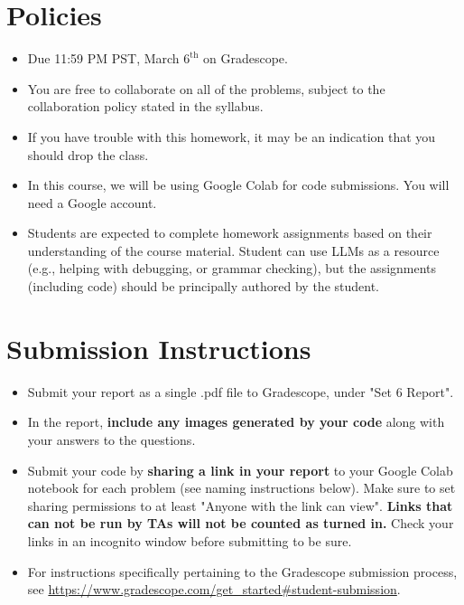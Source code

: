 \documentclass{article}
\begin{document}
\pagestyle{fancy}


\section*{Policies}
\begin{itemize}
	\item Due 11:59 PM PST, March $6^\text{th}$ on Gradescope. 
	\item You are free to collaborate on all of the problems, subject to the collaboration policy stated in the syllabus.
	\item If you have trouble with this homework, it may be an indication that you should drop the class.
	\item In this course, we will be using Google Colab for code submissions. You will need a Google account.
  \item Students are expected to complete homework assignments based on their understanding of the course material. Student can use LLMs as a resource (e.g., helping with debugging, or grammar checking), but the assignments (including code) should be principally authored by the student.
\end{itemize}

\section*{Submission Instructions}

\begin{itemize}
	\item Submit your report as a single .pdf file to Gradescope, under "Set 6 Report". 
	\item In the report, \textbf{include any images generated by your code} along with your answers to the questions.
	\item Submit your code by \textbf{sharing a link in your report} to your Google Colab notebook for each problem (see naming instructions below). Make sure to set sharing permissions to at least "Anyone with the link can view". \textbf{Links that can not be run by TAs will not be counted as turned in.} Check your links in an incognito window before submitting to be sure. 
	\item For instructions specifically pertaining to the Gradescope submission process, see \url{https://www.gradescope.com/get_started#student-submission}.
	
\end{itemize}
\end{document}
